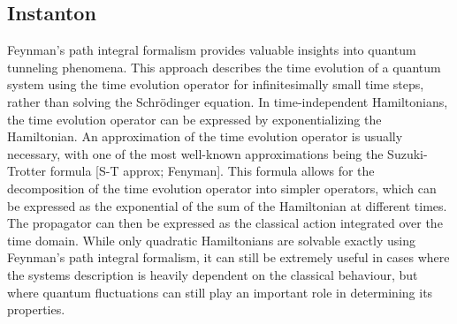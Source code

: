 \documentclass[prb,twocolumn,showpacs,preprintnumbers,amsmath,amssymb, superscriptaddress]{revtex4-2}
\newcommand{\1}{{1\hspace*{-0.5ex} \textrm{l} \hspace*{0.5ex}}}
\begin{document}
\subsection{Instanton}\label{SubSect_Instanton}
Feynman's path integral formalism provides valuable insights into quantum tunneling phenomena. This approach describes the time evolution of a quantum system using the time evolution operator for infinitesimally small time steps, rather than solving the Schrödinger equation. In time-independent Hamiltonians, the time evolution operator can be expressed by exponentializing the Hamiltonian. An approximation of the time evolution operator is usually necessary, with one of the most well-known approximations being the Suzuki-Trotter formula [S-T approx; Fenyman]. This formula allows for the decomposition of the time evolution operator into simpler operators, which can be expressed as the exponential of the sum of the Hamiltonian at different times. The propagator can then be expressed as the classical action integrated over the time domain. While only quadratic Hamiltonians are solvable exactly using Feynman's path integral formalism, it can still be extremely useful in cases where the systems description is heavily dependent on the classical behaviour, but where quantum fluctuations can still play an important role in determining its properties.
\end{document}
